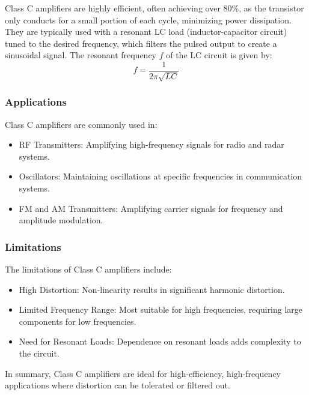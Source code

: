 \documentclass[12pt,a4paper]{report}
\begin{document}
Class C amplifiers are highly efficient, often achieving over 80\%, as the transistor only conducts for a small portion of each cycle, minimizing power dissipation. They are typically used with a resonant LC load (inductor-capacitor circuit) tuned to the desired frequency, which filters the pulsed output to create a sinusoidal signal. The resonant frequency \( f \) of the LC circuit is given by:
\[
f = \frac{1}{2 \pi \sqrt{LC}}
\]

\subsubsection{Applications}
Class C amplifiers are commonly used in:
\begin{itemize}
    \item RF Transmitters: Amplifying high-frequency signals for radio and radar systems.
    \item Oscillators: Maintaining oscillations at specific frequencies in communication systems.
    \item FM and AM Transmitters: Amplifying carrier signals for frequency and amplitude modulation.
\end{itemize}

\subsubsection{Limitations}
The limitations of Class C amplifiers include:
\begin{itemize}
    \item High Distortion: Non-linearity results in significant harmonic distortion.
    \item Limited Frequency Range: Most suitable for high frequencies, requiring large components for low frequencies.
    \item Need for Resonant Loads: Dependence on resonant loads adds complexity to the circuit.
\end{itemize}

In summary, Class C amplifiers are ideal for high-efficiency, high-frequency applications where distortion can be tolerated or filtered out.
\end{document}
